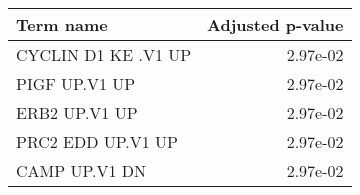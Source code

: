 \begin{tabular}{lr}
\toprule
           Term name &  Adjusted p-value \\
\midrule
 CYCLIN D1 KE .V1 UP &          2.97e-02 \\
       PIGF UP.V1 UP &          2.97e-02 \\
       ERB2 UP.V1 UP &          2.97e-02 \\
   PRC2 EDD UP.V1 UP &          2.97e-02 \\
       CAMP UP.V1 DN &          2.97e-02 \\
\bottomrule
\end{tabular}
